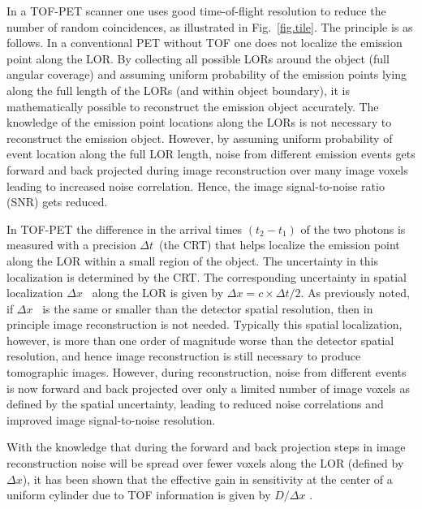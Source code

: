 \documentclass[review]{elsarticle}
\begin{document}
In a TOF-PET scanner one uses good time-of-flight resolution to reduce the number of random coincidences, as illustrated in Fig.~\ref{fig.tile}. The principle is as follows. In a conventional PET without TOF one does not localize the emission point along the LOR. By collecting all possible LORs around the object (full angular coverage) and assuming uniform probability of the emission points lying along the full length of the LORs (and within object boundary), it is mathematically possible to reconstruct the emission object accurately. The knowledge of the emission point locations along the LORs is not necessary to reconstruct the emission object. However, by assuming uniform probability of event location along the full LOR length, noise from different emission events gets forward and back projected during image reconstruction over many image voxels leading to increased noise correlation. Hence, the image signal-to-noise ratio (SNR) gets reduced.

In TOF-PET the difference in the arrival times $(t_2 - t_1)$ of the two photons is measured with a precision $\Delta t$~(the CRT) that helps localize the emission point along the LOR within a small region of the object. The uncertainty in this localization is determined by the CRT. The corresponding uncertainty in spatial localization $\Delta x$~ along the LOR is given by 
$\Delta x=c \times \Delta t/2$. As previously noted, if $\Delta x$~ is the same or smaller than the detector spatial resolution, then in principle image reconstruction is not needed. Typically this spatial localization, however, is more than one order of magnitude worse than the detector spatial resolution, and hence image reconstruction is still necessary to produce tomographic images. However, during reconstruction, noise from different events is now forward and back projected over only a limited number of image voxels as defined by the spatial uncertainty, leading to reduced noise correlations and improved image signal-to-noise resolution.
%
%

With the knowledge that during the forward and back projection steps in image reconstruction noise will be spread over fewer voxels along the LOR (defined by $\Delta x$), it has been  shown  that the effective gain in sensitivity at the center of a uniform cylinder due to TOF information is given by $D/\Delta x$ \cite{snyder, budinger}. 
\end{document}
